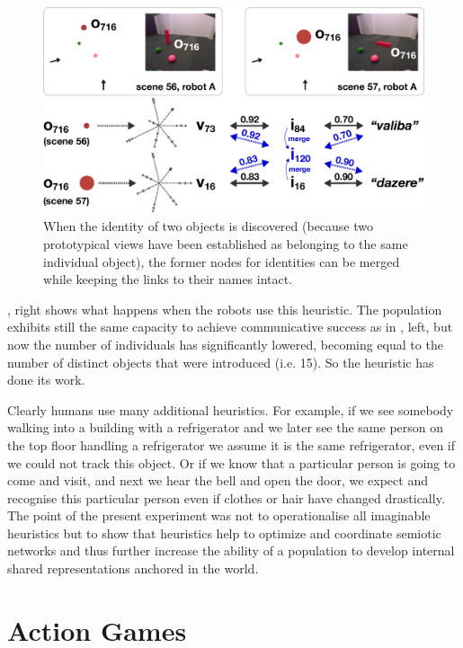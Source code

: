 \begin{figure}[htbp]
  \centerline{\includegraphics[width=.75\textwidth]{chap11/figs/adjust-id}}
\caption{\label{fig:png-optimisation} 
When the identity of two objects is discovered (because two prototypical views have been established 
as belonging to the same individual object), the former nodes for identities can be merged while keeping the 
links to their names intact. 
}
\end{figure}

, right shows what happens when the robots use this heuristic. The population
exhibits still the same capacity to achieve communicative success as
in , left, but now the number of individuals
has significantly lowered, becoming equal to the number of distinct objects 
that were introduced (i.e. 15). So the heuristic has done its work. 

Clearly humans use many additional heuristics. For example, if we see somebody walking into a
building with a refrigerator and we later see the same person on the
top floor handling a refrigerator we assume it is the same
refrigerator, even if we could not track this object. Or if we know that a particular person is 
going to come and visit, and next we hear the bell and open the door, we expect and recognise this particular 
person even if clothes or hair have changed drastically. The
point of the present experiment was not to operationalise all imaginable heuristics but to
show that heuristics help to optimize and coordinate semiotic
networks and thus further increase the ability of a population to develop internal shared
representations anchored in the world.

\section{Action Games} 


